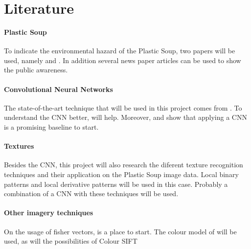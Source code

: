 \documentclass[a4paper, 11pt]{article}
\begin{document}
\section*{Literature}
\paragraph{Plastic Soup} To indicate the environmental hazard of the Plastic Soup, two papers will be used, namely \citet{barnes2005drifting} and \citet{moore2011plastic}. In addition several news paper articles can be used to show the public awareness.

\paragraph{Convolutional Neural Networks} The state-of-the-art technique that will be used in this project comes from \citet{krizhevsky2012imagenet}. To understand the CNN better, \citet{zeiler2014visualizing} will help.
Moreover, \citet{girshick2014rich} and \citet{razavian2014cnn} show that applying a CNN is a promising baseline to start.

\paragraph{Textures} Besides the CNN, this project will also research the diferent texture recognition techniques and their application on the Plastic Soup image data. Local binary patterns \citep{guo2010completed} and local derivative patterns \citep{zhang2010local} will be used in this case. Probably a combination of a CNN with these techniques will be used.

\paragraph{Other imagery techniques} On the usage of fisher vectors, \citet{sanchez2013image} is a place to start. The colour model of \citet{van2010evaluating} will be used, as will the possibilities of Colour SIFT \citep{ai2010color}

\vfill


\end{document}
